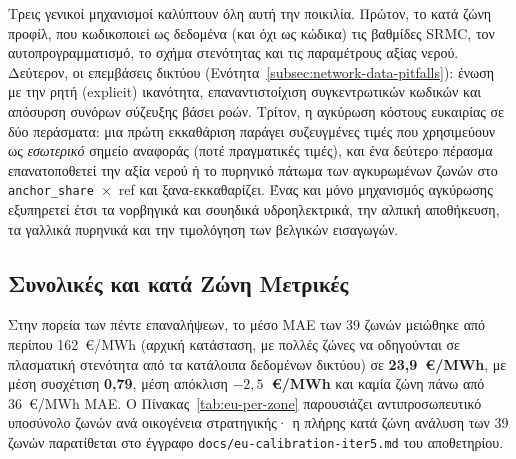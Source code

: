 Τρεις γενικοί μηχανισμοί καλύπτουν όλη αυτή την ποικιλία. Πρώτον, το κατά ζώνη προφίλ, που κωδικοποιεί ως δεδομένα (και όχι ως κώδικα) τις βαθμίδες SRMC, τον αυτοπρογραμματισμό, το σχήμα στενότητας και τις παραμέτρους αξίας νερού. Δεύτερον, οι επεμβάσεις δικτύου (Ενότητα~\ref{subsec:network-data-pitfalls}): ένωση με την ρητή (explicit) ικανότητα, επαναντιστοίχιση συγκεντρωτικών κωδικών και απόσυρση συνόρων σύζευξης βάσει ροών. Τρίτον, η αγκύρωση κόστους ευκαιρίας σε δύο περάσματα: μια πρώτη εκκαθάριση παράγει συζευγμένες τιμές που χρησιμεύουν ως \emph{εσωτερικό} σημείο αναφοράς (ποτέ πραγματικές τιμές), και ένα δεύτερο πέρασμα επανατοποθετεί την αξία νερού ή το πυρηνικό πάτωμα των αγκυρωμένων ζωνών στο \texttt{anchor\_share}~$\times$~ref και ξανα-εκκαθαρίζει. Ένας και μόνο μηχανισμός αγκύρωσης εξυπηρετεί έτσι τα νορβηγικά και σουηδικά υδροηλεκτρικά, την αλπική αποθήκευση, τα γαλλικά πυρηνικά και την τιμολόγηση των βελγικών εισαγωγών.

\subsection{Συνολικές και κατά Ζώνη Μετρικές}
\label{subsec:eu-metrics}

Στην πορεία των πέντε επαναλήψεων, το μέσο MAE των 39 ζωνών μειώθηκε από περίπου 162~€/MWh (αρχική κατάσταση, με πολλές ζώνες να οδηγούνται σε πλασματική στενότητα από τα κατάλοιπα δεδομένων δικτύου) σε \textbf{23,9~€/MWh}, με μέση συσχέτιση \textbf{0,79}, μέση απόκλιση \textbf{$-2{,}5$~€/MWh} και καμία ζώνη πάνω από 36~€/MWh MAE. Ο Πίνακας~\ref{tab:eu-per-zone} παρουσιάζει αντιπροσωπευτικό υποσύνολο ζωνών ανά οικογένεια στρατηγικής· η πλήρης κατά ζώνη ανάλυση των 39 ζωνών παρατίθεται στο έγγραφο \texttt{docs/eu-calibration-iter5.md} του αποθετηρίου.

